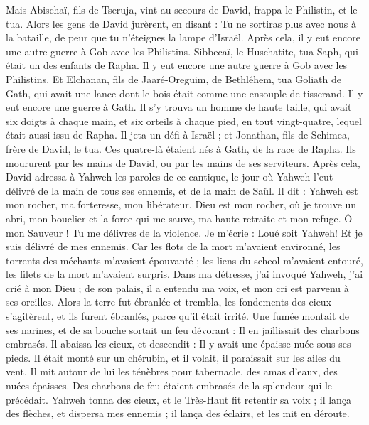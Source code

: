 \begin{multicols}{2}
Mais Abischaï, fils de Tseruja, vint au secours de David, frappa le Philistin, et le tua. Alors les gens de David jurèrent, en disant : Tu ne sortiras plus avec nous à la bataille, de peur que tu n'éteignes la lampe d'Israël.
Après cela, il y eut encore une autre guerre à Gob avec les Philistins. Sibbecaï, le Huschatite, tua Saph, qui était un des enfants de Rapha.
Il y eut encore une autre guerre à Gob avec les Philistins. Et Elchanan, fils de Jaaré-Oreguim, de Bethléhem, tua Goliath de Gath, qui avait une lance dont le bois était comme une ensouple de tisserand.
Il y eut encore une guerre à Gath. Il s'y trouva un homme de haute taille, qui avait six doigts à chaque main, et six orteils à chaque pied, en tout vingt-quatre, lequel était aussi issu de Rapha.
Il jeta un défi à Israël ; et Jonathan, fils de Schimea, frère de David, le tua.
Ces quatre-là étaient nés à Gath, de la race de Rapha. Ils moururent par les mains de David, ou par les mains de ses serviteurs.
\VerseOne{}Après cela, David adressa à Yahweh les paroles de ce cantique, le jour où Yahweh l'eut délivré de la main de tous ses ennemis, et de la main de Saül.
Il dit : Yahweh est mon rocher, ma forteresse, mon libérateur.
Dieu est mon rocher, où je trouve un abri, mon bouclier et la force qui me sauve, ma haute retraite et mon refuge. Ô mon Sauveur ! Tu me délivres de la violence.
Je m'écrie : Loué soit Yahweh! Et je suis délivré de mes ennemis.
Car les flots de la mort m'avaient environné, les torrents des méchants m'avaient épouvanté ;
les liens du scheol m'avaient entouré, les filets de la mort m'avaient surpris.
Dans ma détresse, j'ai invoqué Yahweh, j'ai crié à mon Dieu ; de son palais, il a entendu ma voix, et mon cri est parvenu à ses oreilles.
Alors la terre fut ébranlée et trembla, les fondements des cieux s'agitèrent, et ils furent ébranlés, parce qu'il était irrité.
Une fumée montait de ses narines, et de sa bouche sortait un feu dévorant : Il en jaillissait des charbons embrasés.
Il abaissa les cieux, et descendit : Il y avait une épaisse nuée sous ses pieds.
Il était monté sur un chérubin, et il volait, il paraissait sur les ailes du vent.
Il mit autour de lui les ténèbres pour tabernacle, des amas d'eaux, des nuées épaisses.
Des charbons de feu étaient embrasés de la splendeur qui le précédait.
Yahweh tonna des cieux, et le Très-Haut fit retentir sa voix ;
il lança des flèches, et dispersa mes ennemis ;  il lança des éclairs, et les mit en déroute.

\end{multicols}
